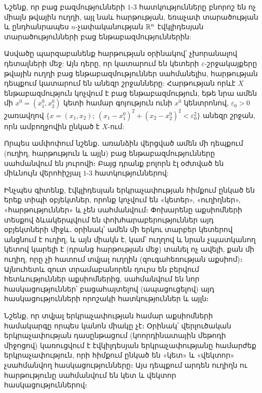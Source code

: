 \documentclass[./main.tex]{subfiles}
\begin{document}
\begin{note_counter}
\par Նշենք, որ բաց բազմությունների $1$-$3$ հատկությունները բնո\-րոշ են ոչ միայն թվային ուղղի, այլ նաև հարթության, եռաչափ տարածության և ընդհանրապես $n$-չափականության $\mathbb{R}^n$ էվկլիդեսյան տարածությունների բաց ենթա\-բազմություններին:

\par Ասվածը պարզաբանենք հարթության օրինակով՝ չխորանալով դետալների մեջ: Այն դերը, որ կատարում են կետերի $\varepsilon$-շրջակայքերը թվային ուղղի բաց ենթաբազ\-մություններ սահմանելիս, հարթության դեպքում կատարում են անեզր շրջանները: Հարթության որևէ $X$ ենթաբազմություն կոչվում է բաց ենթաբազմություն, եթե նրա ամեն մի $x^0=(x_1^0, x_2^0)$ կետի համար գոյություն ունի $x^0$ կենտրոնով, $\varepsilon_0 > 0$ շառավղով $\{x=(x_1, x_2); \ (x_1 - x_1^0)^2 + (x_2 - x_2^0)^2 < \varepsilon_0^2\}$ անեզր շրջան, որն ամբողջովին ընկած է $X$-ում:

\par Որպես ամփոփում նշենք․ առանձին վերցված ամեն մի դեպքում (ուղիղ, հար\-թու\-թյուն և այլն) բաց ենթաբազմությունները սահմանվում են յուրովի։ Բայց դրանք բոլորն էլ օժտված են միևնույն վերոհիշյալ
$1$-$3$ հատկություններով:
\end{note_counter}

\begin{note_counter}
\par Ինչպես գիտենք, էվկլիդեսյան երկրաչափության հիմքում ըն\-կած են երեք տիպի օբյեկտներ, որոնք կոչվում են «կետեր», «ուղիղներ», «հար\-թու\-թյուն\-ներ» և չեն սահմանվում։ Փոխարենը աքսիոմների տեսքով ձևակերպվում են փոխ\-հա\-րա\-բե\-րություններ այդ օբյեկտների միջև․ օրինակ՝ ամեն մի երկու տարբեր կե\-տե\-րով անցնում է ուղիղ, և այն միակն է, կամ՝ ուղղով և նրան չպատկանող կետով կարելի է (դրանց հարթության մեջ) տանել ոչ ավելի, քան մի ուղիղ, որը չի հատում տվյալ ուղղին (զուգահեռության աքսիոմ)։ Այնուհետև զուտ տրամաբանորեն դուրս են բերվում հետևություններ աքսիոմներից, սահմանվում են նոր հասկացություններ՝ բացահայտելով (ապացուցելով) այդ հասկացությունների որոշակի հատկություններ և այլն։
\end{note_counter}

\par Նշենք, որ տվյալ երկրաչափության համար աքսիոմների համակարգը որպես կանոն միակը չէ։ Օրինակ՝ վերլուծական երկրաչափության դասընթացում (կոորդի\-նա\-տային մեթոդի միջոցով) կառուցվում է էվկիլդեսյան երկրաչափությանը համ\-արժեք երկրաչափություն, որի հիմքում ընկած են «կետ» և «վեկտոր» չսահմանվող հասկացու\-թյունները։ Այս դեպքում արդեն ուղիղն ու հարթությունը սահմանվում են կետ և վեկտոր հասկացու\-թյուններով։
\end{document}
